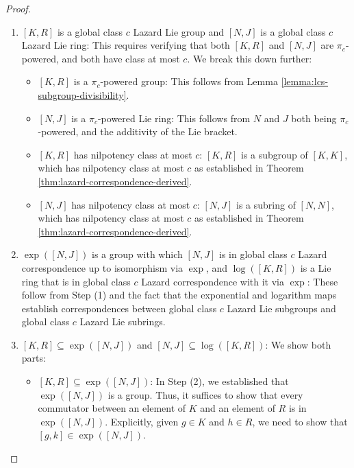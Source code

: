 \begin{proof}
  \begin{enumerate}
  \item $[K,R]$ is a global class $c$ Lazard Lie group and $[N,J]$ is a
    global class $c$ Lazard Lie ring: This requires verifying that
    both $[K,R]$ and $[N,J]$ are $\pi_c$-powered, and both have class
    at most $c$. We break this down further:

    \begin{itemize}
    \item $[K,R]$ is a $\pi_c$-powered group: This follows from Lemma
      \ref{lemma:lcs-subgroup-divisibility}.
    \item $[N,J]$ is a $\pi_c$-powered Lie ring: This follows from $N$
      and $J$ both being $\pi_c$-powered, and the additivity of the
      Lie bracket.
    \item $[K,R]$ has nilpotency class at most $c$: $[K,R]$ is a
      subgroup of $[K,K]$, which has nilpotency class at most $c$ as
      established in Theorem \ref{thm:lazard-correspondence-derived}.
    \item $[N,J]$ has nilpotency class at most $c$: $[N,J]$ is a
      subring of $[N,N]$, which has nilpotency class at most $c$ as
      established in Theorem \ref{thm:lazard-correspondence-derived}.
    \end{itemize}

  \item $\exp([N,J])$ is a group with which $[N,J]$ is in global
    class $c$ Lazard correspondence up to isomorphism via $\exp$, and
    $\log([K,R])$ is a Lie ring that is in global class $c$ Lazard
    correspondence with it via $\exp$: These follow from Step (1) and
    the fact that the exponential and logarithm maps establish
    correspondences between global class $c$ Lazard Lie subgroups and
    global class $c$ Lazard Lie subrings.

  \item $[K,R] \subseteq \exp([N,J])$ and $[N,J] \subseteq
    \log([K,R])$: We show both parts:

    \begin{itemize}
    \item $[K,R] \subseteq \exp([N,J])$: In Step (2), we established
      that $\exp([N,J])$ is a group. Thus, it suffices to show that
      every commutator between an element of $K$ and an element of $R$
      is in $\exp([N,J])$. Explicitly, given $g \in K$ and $h \in R$,
      we need to show that $[g,k] \in \exp([N,J])$. 


\end{itemize}
\end{enumerate}
\end{proof}
